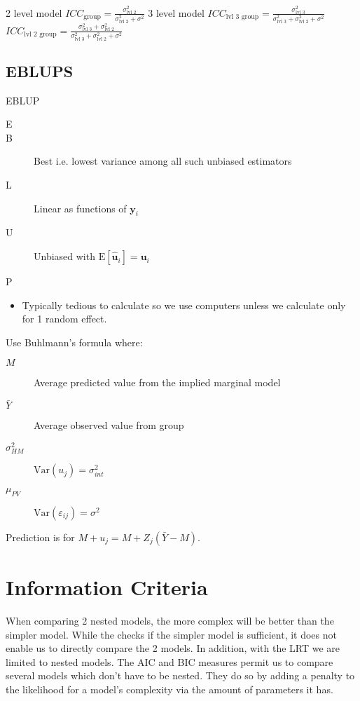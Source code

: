 \documentclass[english]{article}
\begin{document}
\begin{multicols*}{2}
2 level model $ICC_{\text{group}} = \frac{\sigma^{2}_{\text{lvl 2}}}{\sigma^{2}_{\text{lvl 2}} + \sigma^{2}}$
3 level model
	$ICC_{\text{lvl 3 group}} = \frac{\sigma^{2}_{\text{lvl 3}}}{\sigma^{2}_{\text{lvl 3}} + \sigma^{2}_{\text{lvl 2}} + \sigma^{2}}$
	$ICC_{\text{lvl 2 group}} = \frac{\sigma^{2}_{\text{lvl 3}} + \sigma^{2}_{\text{lvl 2}}}{\sigma^{2}_{\text{lvl 3}} + \sigma^{2}_{\text{lvl 2}} + \sigma^{2}}$


\subsection{EBLUPS}
EBLUP
\begin{description}
	\item[E]	
	\item[B]	Best i.e. lowest variance among all such unbiased estimators
	\item[L]	Linear as functions of $\bm{y}_{i}$
	\item[U]	Unbiased with $\text{E}[\hat{\bm{u}}_{i}] = \bm{u}_{i}$
	\item[P]	
\end{description}

\begin{itemize}
	\item	Typically tedious to calculate so we use computers unless we calculate only for 1 random effect.
\end{itemize}


Use Buhlmann's formula where:
\begin{description}
	\item[$M$]	Average predicted value from the implied marginal model
	\item[$\bar{Y}$]	Average observed value from group
	\item[$\sigma^{2}_{HM}$]	$\text{Var}(u_{j}) = \sigma^{2}_{int}$
	\item[$\mu_{PV}$]	$\text{Var}(\varepsilon_{ij}) = \sigma^{2}$
\end{description}
Prediction is for $M + u_{j} = M + Z_{j} (\bar{Y} - M)$.



\section{Information Criteria}
\begin{rappel_enhanced}[Context]
When comparing 2 nested models, the more complex will be better than the simpler model. While the \textit{\underline{}} checks if the simpler model is sufficient, it does not enable us to directly compare the 2 models. In addition, with the LRT we are limited to nested models. The AIC and BIC measures permit us to compare several models which don't have to be nested. They do so by adding a penalty to the likelihood for a model's complexity via the amount of parameters it has.


\end{rappel_enhanced}
\end{multicols*}
\end{document}
